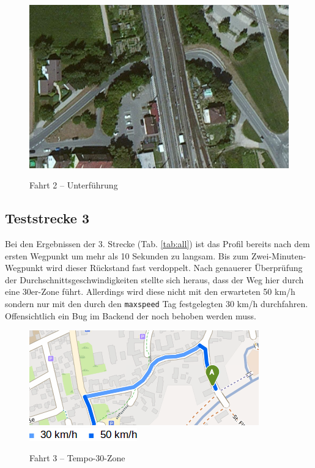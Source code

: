 \begin{figure}[htb]
\centering
\caption{Fahrt 2 -- Unterführung}
\label{fig:traintunnel}
\includegraphics[width = 0.70 \textwidth]{../media/traintunnel.png} \\
\end{figure}


\subsection{Teststrecke 3}

Bei den Ergebnissen der 3. Strecke (Tab. \ref{tab:all}) ist das Profil bereits nach dem ersten Wegpunkt um mehr als 10 Sekunden zu langsam.
Bis zum Zwei-Minuten-Wegpunkt wird dieser Rückstand fast verdoppelt.
Nach genauerer Überprüfung der Durchschnittsgeschwindigkeiten stellte sich heraus, dass der Weg hier durch eine 30er-Zone führt.
Allerdings wird diese nicht mit den erwarteten 50 km/h sondern nur mit den durch den \texttt{maxspeed} Tag festgelegten 30 km/h durchfahren.
Offensichtlich ein Bug im Backend der noch behoben werden muss.

\begin{figure}[htb]
\centering
\caption{Fahrt 3 -- Tempo-30-Zone}
\label{fig:temp30}
\includegraphics[width = 0.60 \textwidth]{../media/Fahrt3_temp30.png} \\
\includegraphics[width = 0.20 \textwidth]{../media/legend3.png} \\
\end{figure}

